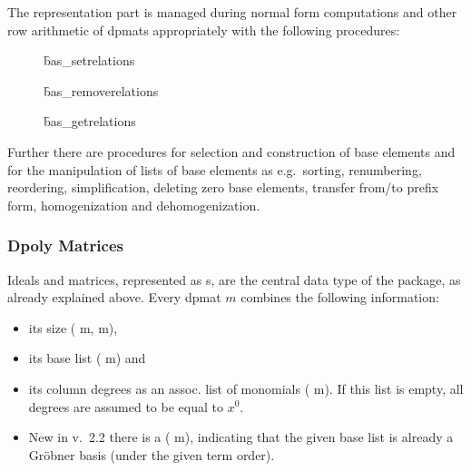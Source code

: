 The representation part is managed during normal form computations
and other row arithmetic of dpmats appropriately with the following
procedures:
\begin{description}
\item[]
  \begin{syntax}
    \f{bas\_setrelations} 
  \end{syntax}
  \hypertarget{procedure:BAS_SETRELATIONS}{}

\item[]
  \begin{syntax}
    \f{bas\_removerelations} 
  \end{syntax}
  \hypertarget{procedure:BAS_REMOVERELATIONS}{}

\item[]
  \begin{syntax}
    \f{bas\_getrelations} 
  \end{syntax}
  \hypertarget{procedure:BAS_GETRELATIONS}{}
\end{description}

Further there are procedures for selection and construction of base
elements and for the manipulation of lists of base elements as e.g.\
sorting, renumbering, reordering, simplification, deleting zero base
elements, transfer from/to prefix form, homogenization and dehomogenization.

\subsubsection{Dpoly Matrices}

Ideals and matrices, represented as s, are the central
data type of the \package{CALI} package, as already explained above. Every
dpmat $m$ combines the following information:
\begin{itemize}
\item its size ( m, m),

\item its base list ( m) and

\item its column degrees as an assoc. list of monomials
( m). If this list is empty, all degrees are
assumed to be equal to $x^0$.

\item New in v.~2.2 there is a  ( m),
indicating that the given base list is already a Gr\"obner basis (under the
given term order).
\end{itemize}

